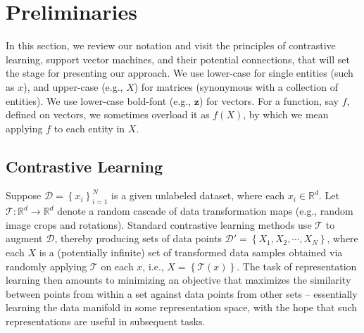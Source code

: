 \documentclass[letterpaper]{article} \usepackage{aaai22}  \usepackage{times}  \usepackage{helvet}  \usepackage{courier}  \usepackage[hyphens]{url}  \usepackage{graphicx} \urlstyle{rm} \def\UrlFont{\rm}  \usepackage{natbib}  \usepackage{caption} \DeclareCaptionStyle{ruled}{labelfont=normalfont,labelsep=colon,strut=off} \frenchspacing  \setlength{\pdfpagewidth}{8.5in}  \setlength{\pdfpageheight}{11in}
\newcommand{\vx}{x}\newcommand{\px}{x^+}\newcommand{\nx}{x^{-}} \newcommand{\vz}{\bm{z}}
\newcommand{\dataset}{\mathcal{D}}
\newcommand{\mX}{{X}}
\newcommand{\trans}{\mathcal{T}}
\newcommand{\sX}{{X}}
\newcommand{\set}[1]{\left\{#1\right\}}
\newcommand{\reals}[1]{\mathbb{R}^{#1}}
\begin{document}
\section{Preliminaries}
In this section, we review our notation and visit the principles of contrastive learning, support vector machines, and their potential connections, that will set the stage for presenting our approach. We use lower-case for single entities (such as $x$), and upper-case (e.g., $\mX$) for matrices (synonymous with a collection of entities). We use lower-case bold-font (e.g., $\vz$) for vectors. For a function, say $f$, defined on vectors, we sometimes overload it as $f(X)$, by which we mean applying $f$ to each entity in $X$. 

\subsection{Contrastive Learning}
Suppose $\dataset=\set{\vx_i}_{i=1}^N$ is a given unlabeled dataset, where each $\vx_i\in\reals{d}$. Let $\trans\!:\reals{d}\to\reals{d}$ denote a random cascade of data transformation maps (e.g., random image crops and rotations). 
Standard contrastive learning methods use $\trans$ to augment $\dataset$, thereby producing sets of data points $\dataset'=\set{\sX_1,\sX_2,\cdots, \sX_N}$, where each $\sX$ is a (potentially infinite) set of transformed data samples obtained via randomly applying $\trans$ on each $\vx$, i.e., $\sX=\set{\trans(\vx)}$. The task of representation learning then amounts to minimizing an objective that maximizes the similarity between points from within a set against data points from other sets -- essentially learning the data manifold in some representation space, with the hope that such representations are useful in subsequent tasks. 
\end{document}
